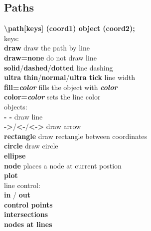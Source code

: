 \documentclass[10pt]{article}
\newcommand{\tikzcmd}[1]{\textbf{#1}}
\newcommand{\tikzparam}[1]{\textbf{\emph{#1}}}
\begin{document}
\begin{multicols}{2}
        \section{Paths}
        \tikzcmd{\textbackslash path[keys] (coord1) object (coord2);}\\
        keys:\\
        \tikzcmd{draw} draw the path by line\\
        \tikzcmd{draw=none} do not draw line\\
        \tikzcmd{solid}/\tikzcmd{dashed}/\tikzcmd{dotted} line dashing\\
        \tikzcmd{ultra thin}/\tikzcmd{normal}/\tikzcmd{ultra tick} line width\\
        \tikzcmd{fill=\tikzparam{color}} fills the object with \tikzparam{color}\\
        \tikzcmd{color=\tikzparam{color}} sets the line color\\
        objects:\\
        \tikzcmd{- -} draw line\\
        \tikzcmd{->}/\tikzcmd{<-}/\tikzcmd{<->} draw arrow\\
        \tikzcmd{rectangle} draw rectangle between coordinates\\
        \tikzcmd{circle} draw circle\\
        \tikzcmd{ellipse}\\
        \tikzcmd{node} places a node at current postion\\
        \tikzcmd{plot}\\
        line control:\\
        \tikzcmd{in} / \tikzcmd{out}\\
        \tikzcmd{control points}\\
        \tikzcmd{intersections}\\
        \tikzcmd{nodes at lines}


\end{multicols}
\end{document}
